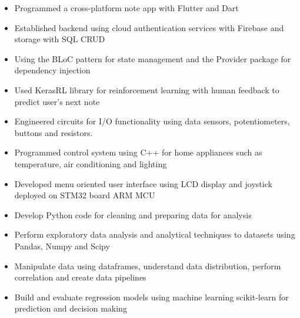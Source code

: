 \documentclass[11pt,a4paper,ragged2e]{altacv}
\begin{document}
\begin{paracol}{1}
\tightdivider


\begin{itemize}
\item Programmed a cross-platform note app with Flutter and Dart
\item Established backend using cloud authentication services with Firebase and storage with SQL CRUD 
\item Using the BLoC pattern for state management and the Provider package for dependency injection
\item Used KerasRL library for reinforcement learning with human feedback to predict user's next note
\end{itemize}
\tightdivider

\begin{itemize}
\item Engineered circuits for I/O functionality using data sensors, potentiometers, buttons and resistors.
\item Programmed control system using C++ for home appliances such as temperature, air conditioning and lighting 
\item Developed menu oriented user interface using LCD display and joystick deployed on STM32 board ARM MCU
\end{itemize}


\medskip

\begin{itemize}
\item Develop Python code for cleaning and preparing data for analysis 
\item Perform exploratory data analysis and analytical techniques to datasets using Pandas, Numpy and Scipy
\item Manipulate data using dataframes, understand data distribution, perform correlation and create data pipelines
\item Build and evaluate regression models using machine learning scikit-learn for prediction and decision making
\end{itemize}
\tightdivider


\end{paracol}
\end{document}
